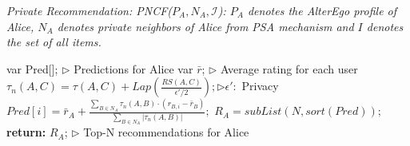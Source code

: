 \begin{algorithm}[!htb]
\caption{\small\itshape Private Recommendation: PNCF($P_A, N_A, \mathcal{I}$): $P_A$ denotes the AlterEgo profile of Alice, $N_A$ denotes private neighbors of Alice from PSA mechanism and $I$ denotes the set of all items.}
\label{PrivRecoAlgo}
\begin{algorithmic}[1]
\State var Pred[]; \hfill $\rhd$ Predictions for Alice
\State var $\bar{r}$; \hfill $\rhd$ Average rating for each user
\State $\tau_{n}(A, C) = \tau(A, C) + Lap(\frac{RS(A, C)}{\epsilon' / 2});$\hfill $\rhd \epsilon':$ Privacy
\EndFor
{}
\State $Pred[i]=\bar{r}_{A} +\frac{\sum_{B \in N_{A}} \tau_{n}(A,B) \cdot (r_{B,i}- \bar{r}_B)}{\sum_{B \in N_{A}} |\tau_{n}(A,B)| } ;$
\EndFor
\State $R_{A}=subList(N,sort(Pred));$
\State \textbf{return:} $R_{A}$; \hfill $\rhd$ Top-N recommendations for Alice
\end{algorithmic}
\end{algorithm}
